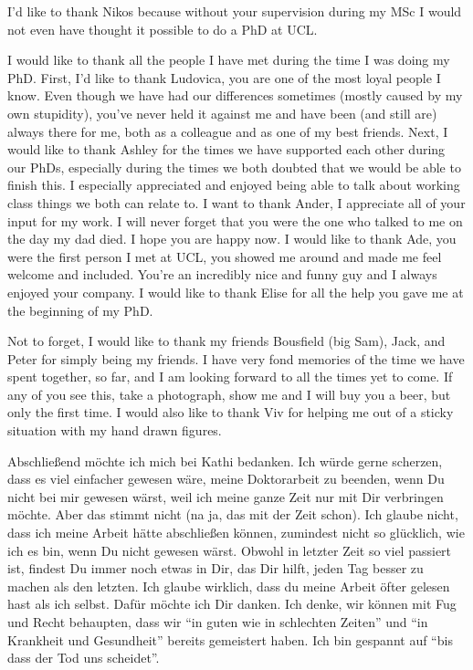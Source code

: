 \begin{acknowledgements}
    I'd like to thank Nikos because without your supervision during my \gls{MSc} I would not even have thought it possible to do a \gls{PhD} at \gls{UCL}.

    I would like to thank all the people I have met during the time I was doing my \gls{PhD}. First, I'd like to thank Ludovica, you are one of the most loyal people I know. Even though we have had our differences sometimes (mostly caused by my own stupidity), you've never held it against me and have been (and still are) always there for me, both as a colleague and as one of my best friends. Next, I would like to thank Ashley for the times we have supported each other during our \glspl{PhD}, especially during the times we both doubted that we would be able to finish this. I especially appreciated and enjoyed being able to talk about working class things we both can relate to. I want to thank Ander, I appreciate all of your input for my work. I will never forget that you were the one who talked to me on the day my dad died. I hope you are happy now. I would like to thank Ade, you were the first person I met at \gls{UCL}, you showed me around and made me feel welcome and included. You're an incredibly nice and funny guy and I always enjoyed your company. I would like to thank Elise for all the help you gave me at the beginning of my \gls{PhD}.

    Not to forget, I would like to thank my friends Bousfield (big Sam), Jack, and Peter for simply being my friends. I have very fond memories of the time we have spent together, so far, and I am looking forward to all the times yet to come. If any of you see this, take a photograph, show me and I will buy you a beer, but only the first time. I would also like to thank Viv for helping me out of a sticky situation with my hand drawn figures. 

    Abschließend möchte ich mich bei Kathi bedanken. Ich würde gerne scherzen, dass es viel einfacher gewesen wäre, meine Doktorarbeit zu beenden, wenn Du nicht bei mir gewesen wärst, weil ich meine ganze Zeit nur mit Dir verbringen möchte. Aber das stimmt nicht (na ja, das mit der Zeit schon). Ich glaube nicht, dass ich meine Arbeit hätte abschließen können, zumindest nicht so glücklich, wie ich es bin, wenn Du nicht gewesen wärst. Obwohl in letzter Zeit so viel passiert ist, findest Du immer noch etwas in Dir, das Dir hilft, jeden Tag besser zu machen als den letzten. Ich glaube wirklich, dass du meine Arbeit öfter gelesen hast als ich selbst. Dafür möchte ich Dir danken. Ich denke, wir können mit Fug und Recht behaupten, dass wir ``in guten wie in schlechten Zeiten'' und ``in Krankheit und Gesundheit'' bereits gemeistert haben. Ich bin gespannt auf ``bis dass der Tod uns scheidet''.


\end{acknowledgements}

